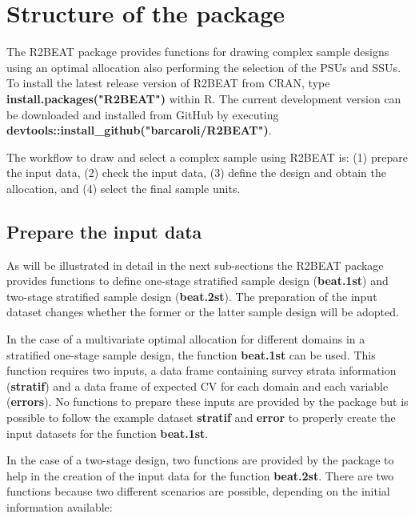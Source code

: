 \section{Structure of the package} 
The {R2BEAT} package provides functions for drawing complex sample designs using an optimal allocation also performing  the selection of the PSUs and SSUs.
To install the latest release version of {R2BEAT} from CRAN, type \textbf{install.packages("R2BEAT")}
within {R}. 
The current development version can be downloaded and installed from GitHub by executing \textbf{devtools::install\_github("barcaroli/R2BEAT")}.


The workflow to draw and select a complex sample using {R2BEAT} is: (1) prepare the input data, (2) check the input data,
(3) define the design and obtain the allocation, and (4) select the final sample units.

\subsection{Prepare the input data}
\label{sec:prepinput}
As will be illustrated in detail in the next sub-sections the {R2BEAT} package provides functions to define one-stage stratified sample design (\textbf{beat.1st}) and two-stage stratified sample design (\textbf{beat.2st}). The preparation of the input dataset changes whether the former or the latter sample design will be adopted.

In the case of a multivariate optimal allocation for different domains in a stratified one-stage sample design, the function \textbf{beat.1st} can be used. 
This function requires two inputs, 	
a data frame containing survey strata information (\textbf{stratif}) and a data frame of expected CV for each domain and each variable (\textbf{errors}). No functions to prepare these inputs are provided by the package but is possible to follow the example dataset \textbf{stratif} and \textbf{error} to properly create the input datasets for the function \textbf{beat.1st}.

In the case of a two-stage design, two functions are provided by the package to help in the creation of the input data for the function \textbf{beat.2st}. 
There are two functions because two different scenarios are possible, depending on the initial information available:

